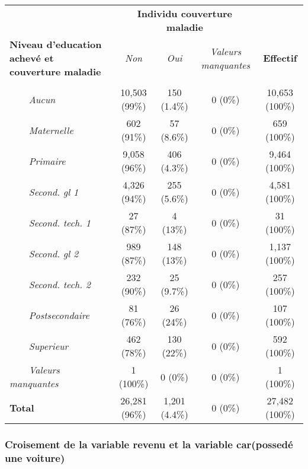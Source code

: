 \documentclass[
]{article}
\begin{document}
\begin{table}[!t]
\fontsize{12.0pt}{14.4pt}\selectfont
\begin{tabular*}{\linewidth}{@{\extracolsep{\fill}}lcccc}
\toprule
 & \multicolumn{3}{c}{\textbf{Individu couverture maladie}} &  \\ 
\cmidrule(lr){2-4}
\textbf{Niveau d'education achevé et couverture maladie} & \emph{Non} & \emph{Oui} & \emph{Valeurs manquantes} & \textbf{Effectif} \\ 
\midrule\addlinespace[2.5pt]
{\bfseries Niveau d'éducation achevé} &  &  &  &  \\ 
{\itshape     Aucun} & 10,503 (99\%) & 150 (1.4\%) & 0 (0\%) & 10,653 (100\%) \\ 
{\itshape     Maternelle} & 602 (91\%) & 57 (8.6\%) & 0 (0\%) & 659 (100\%) \\ 
{\itshape     Primaire} & 9,058 (96\%) & 406 (4.3\%) & 0 (0\%) & 9,464 (100\%) \\ 
{\itshape     Second. gl 1} & 4,326 (94\%) & 255 (5.6\%) & 0 (0\%) & 4,581 (100\%) \\ 
{\itshape     Second. tech. 1} & 27 (87\%) & 4 (13\%) & 0 (0\%) & 31 (100\%) \\ 
{\itshape     Second. gl 2} & 989 (87\%) & 148 (13\%) & 0 (0\%) & 1,137 (100\%) \\ 
{\itshape     Second. tech. 2} & 232 (90\%) & 25 (9.7\%) & 0 (0\%) & 257 (100\%) \\ 
{\itshape     Postsecondaire} & 81 (76\%) & 26 (24\%) & 0 (0\%) & 107 (100\%) \\ 
{\itshape     Superieur} & 462 (78\%) & 130 (22\%) & 0 (0\%) & 592 (100\%) \\ 
{\itshape     Valeurs manquantes} & 1 (100\%) & 0 (0\%) & 0 (0\%) & 1 (100\%) \\ 
{\bfseries Total} & 26,281 (96\%) & 1,201 (4.4\%) & 0 (0\%) & 27,482 (100\%) \\ 
\bottomrule
\end{tabular*}
\end{table}

\subsubsection{Croisement de la variable revenu et la variable
car(possedé une
voiture)}\label{croisement-de-la-variable-revenu-et-la-variable-carposseduxe9-une-voiture}
\end{document}
